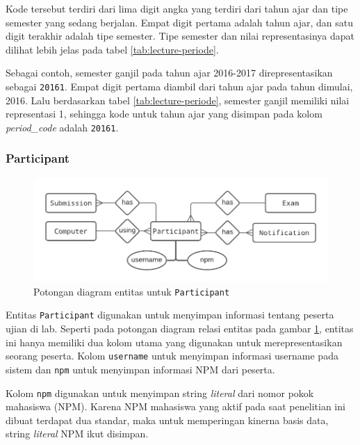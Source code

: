     Kode tersebut terdiri dari lima digit angka yang terdiri dari tahun ajar dan tipe semester
    yang sedang berjalan. Empat digit pertama adalah tahun ajar, dan satu digit terakhir adalah
    tipe semester. Tipe semester dan nilai representasinya dapat dilihat lebih jelas pada tabel
    \ref{tab:lecture-periode}.
    
    Sebagai contoh, semester ganjil pada tahun ajar 2016-2017 direpresentasikan sebagai
    \texttt{20161}. Empat digit pertama diambil dari tahun ajar pada tahun dimulai, 2016. Lalu
    berdasarkan tabel \ref{tab:lecture-periode}, semester ganjil memiliki nilai representasi
    1, sehingga kode untuk tahun ajar yang disimpan pada kolom \textit{period\_code} 
    adalah \texttt{20161}.
    
\subsubsection{Participant}
    \begin{figure}
        \centering
        \includegraphics{Gambar/erd-details/ERD--New - Participant.pdf}
        \caption{Potongan diagram entitas untuk \texttt{Participant}}
        \label{fig:erd_participant}
    \end{figure}
    
    Entitas \texttt{Participant} digunakan untuk menyimpan informasi tentang peserta
    ujian di lab. Seperti pada potongan diagram relasi entitas pada gambar \ref{fig:erd_participant},
    entitas ini hanya memiliki dua kolom utama yang digunakan untuk merepresentasikan
    seorang peserta. Kolom \texttt{username} untuk menyimpan informasi username pada sistem
    dan \texttt{npm} untuk menyimpan informasi NPM dari peserta.
    
    Kolom \texttt{npm} digunakan untuk menyimpan string \textit{literal} dari nomor pokok mahasiswa
    (NPM). Karena NPM mahasiswa yang aktif pada saat penelitian ini dibuat terdapat dua standar, maka
    untuk memperingan kinerna basis data, string \textit{literal} NPM ikut disimpan.
    
